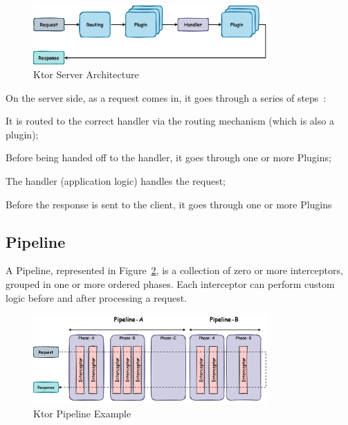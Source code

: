 \begin{figure}[!htb]
    \centering
    \includegraphics[width=0.8\textwidth]{../figures/03_ktor-server-architecture}
    \caption{Ktor Server Architecture}
    \label{fig:ktor-server-architecture}
\end{figure}

On the server side, as a request comes in, it goes through a series of steps~\cite{ktor-server-plugins}:

\begin{boldenumerate}
    \item It is routed to the correct handler via the routing mechanism (which is also a plugin);
    \item Before being handed off to the handler, it goes through one or more Plugins;
    \item The handler (application logic) handles the request;
    \item Before the response is sent to the client, it goes through one or more Plugins
\end{boldenumerate}

\subsection{Pipeline}\label{subsec:pipeline}

A Pipeline, represented in Figure~\ref{fig:ktor-pipeline}, is a collection of zero or more interceptors, grouped in one or more ordered phases.
Each interceptor can perform custom logic before and after processing a request.

\begin{figure}[!htb]
    \centering
    \includegraphics[width=0.8\textwidth]{../figures/03_ktor-pipeline}
    \caption{Ktor Pipeline Example}
    \label{fig:ktor-pipeline}
\end{figure}

